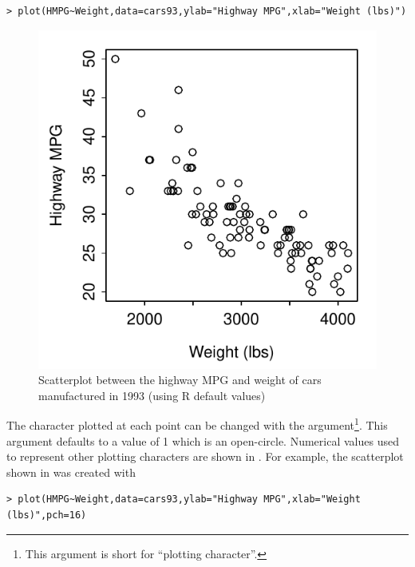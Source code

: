 \documentclass[10pt,openany]{book}\usepackage[]{graphicx}\usepackage[]{color}
\makeatletter
\newenvironment{kframe}{%
 \def\at@end@of@kframe{}%
 \ifinner\ifhmode%
  \def\at@end@of@kframe{\end{minipage}}%
  \begin{minipage}{\columnwidth}%
 \fi\fi%
 \def\FrameCommand##1{\hskip\@totalleftmargin \hskip-\fboxsep
 \colorbox{shadecolor}{##1}\hskip-\fboxsep
     \hskip-\linewidth \hskip-\@totalleftmargin \hskip\columnwidth}%
 \MakeFramed {\advance\hsize-\width
   \@totalleftmargin\z@ \linewidth\hsize
   \@setminipage}}%
 {\par\unskip\endMakeFramed%
 \at@end@of@kframe}
\newenvironment{knitrout}{}{} %
\makeatother
\begin{document}
\begin{knitrout}
\color{fgcolor}\begin{kframe}
\begin{verbatim}
> plot(HMPG~Weight,data=cars93,ylab="Highway MPG",xlab="Weight (lbs)")
\end{verbatim}
\end{kframe}\begin{figure}[hbtp]

{\centering \includegraphics[width=.4\linewidth]{Figs/Scatplot1-1} 

}

\caption[Scatterplot between the highway MPG and weight of cars manufactured in 1993 (using R default values)]{Scatterplot between the highway MPG and weight of cars manufactured in 1993 (using R default values)}\label{fig:Scatplot1}
\end{figure}


\end{knitrout}

The character plotted at each point can be changed with the  argument\footnote{This argument is short for ``plotting character''.}.  This argument defaults to a value of 1 which is an open-circle.  Numerical values used to represent other plotting characters are shown in .  For example, the scatterplot shown in  was created with
\begin{knitrout}
\color{fgcolor}\begin{kframe}
\begin{verbatim}
> plot(HMPG~Weight,data=cars93,ylab="Highway MPG",xlab="Weight (lbs)",pch=16)
\end{verbatim}
\end{kframe}
\end{knitrout}
\end{document}
